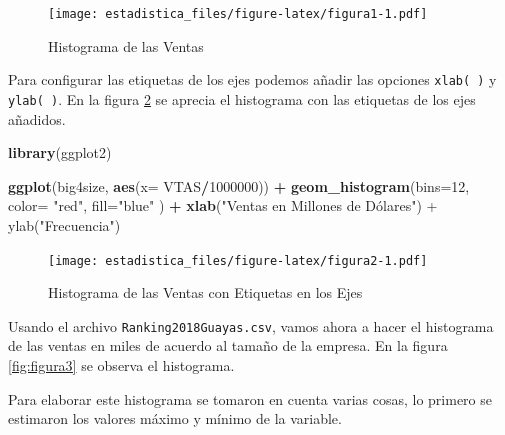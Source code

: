 \documentclass[]{book}
\newenvironment{Shaded}{\begin{snugshade}}{\end{snugshade}}
\newcommand{\KeywordTok}[1]{\textcolor[rgb]{0.13,0.29,0.53}{\textbf{#1}}}
\newcommand{\DataTypeTok}[1]{\textcolor[rgb]{0.13,0.29,0.53}{#1}}
\newcommand{\DecValTok}[1]{\textcolor[rgb]{0.00,0.00,0.81}{#1}}
\newcommand{\StringTok}[1]{\textcolor[rgb]{0.31,0.60,0.02}{#1}}
\newcommand{\OperatorTok}[1]{\textcolor[rgb]{0.81,0.36,0.00}{\textbf{#1}}}
\newcommand{\NormalTok}[1]{#1}
\begin{document}
\begin{figure}
\centering
\texttt{[image: estadistica\_files/figure-latex/figura1-1.pdf]}
\caption{\label{fig:figura1}Histograma de las Ventas}
\end{figure}

Para configurar las etiquetas de los ejes podemos añadir las opciones
\texttt{xlab(\ )} y \texttt{ylab(\ )}. En la figura \ref{fig:figura2} se
aprecia el histograma con las etiquetas de los ejes añadidos.

\begin{Shaded}
\begin{Highlighting}[]
\KeywordTok{library}\NormalTok{(ggplot2)}

\KeywordTok{ggplot}\NormalTok{(big4size, }\KeywordTok{aes}\NormalTok{(}\DataTypeTok{x=}\NormalTok{ VTAS}\OperatorTok{/}\DecValTok{1000000}\NormalTok{)) }\OperatorTok{+}\StringTok{ }
\StringTok{  }\KeywordTok{geom_histogram}\NormalTok{(}\DataTypeTok{bins=}\DecValTok{12}\NormalTok{, }\DataTypeTok{color=} \StringTok{"red"}\NormalTok{,  }\DataTypeTok{fill=}\StringTok{"blue"}\NormalTok{ ) }\OperatorTok{+}\StringTok{ }
\StringTok{  }\KeywordTok{xlab}\NormalTok{(}\StringTok{"Ventas en Millones de Dólares") + ylab("}\NormalTok{Frecuencia}\StringTok{")}
\end{Highlighting}
\end{Shaded}

\begin{figure}
\centering
\texttt{[image: estadistica\_files/figure-latex/figura2-1.pdf]}
\caption{\label{fig:figura2}Histograma de las Ventas con Etiquetas en los
Ejes}
\end{figure}

Usando el archivo \texttt{Ranking2018Guayas.csv}, vamos ahora a hacer el
histograma de las ventas en miles de acuerdo al tamaño de la empresa. En
la figura \ref{fig:figura3} se observa el histograma.

Para elaborar este histograma se tomaron en cuenta varias cosas, lo
primero se estimaron los valores máximo y mínimo de la variable.

\begin{Shaded}
\end{Shaded}
\end{document}
